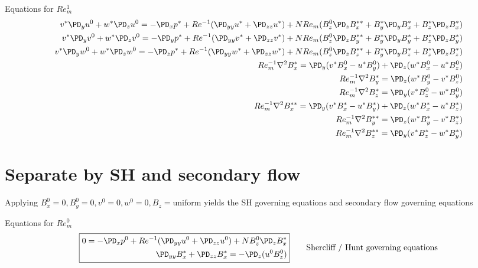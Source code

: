 \documentclass[11pt]{article}
\begin{document}
Equations for $Re_m^1$
\begin{equation}\begin{aligned}
v^* \PD_y u^0 + w^* \PD_z u^0 = -\PD_x p^*+ Re^{-1} (\PD_{yy} u^* + \PD_{zz} u^*) + N Re_m (B_z^0 \PD_z B_x^{**} + B_y^* \PD_y B_x^* + B_z^* \PD_z B_x^* ) \\
v^* \PD_y v^0 + w^* \PD_z v^0 = -\PD_y p^*+ Re^{-1} (\PD_{yy} v^* + \PD_{zz} v^*) + N Re_m (B_z^0 \PD_z B_y^{**} + B_y^* \PD_y B_y^* + B_z^* \PD_z B_y^* ) \\
v^* \PD_y w^0 + w^* \PD_z w^0 = -\PD_z p^*+ Re^{-1} (\PD_{yy} w^* + \PD_{zz} w^*) + N Re_m (B_z^0 \PD_z B_z^{**} + B_y^* \PD_y B_z^* + B_z^* \PD_z B_z^* ) \\
Re_m^{-1} \nabla^2 B_x^{*}  = \PD_y (v^* B_x^{0} - u^* B_y^{0}) + \PD_z (w^* B_x^{0} - u^* B_z^{0}) \\
Re_m^{-1} \nabla^2 B_y^{*}  = \PD_z (w^* B_y^{0} - v^* B_z^{0}) \\
Re_m^{-1} \nabla^2 B_z^{*}  = \PD_y (v^* B_z^{0} - w^* B_y^{0}) \\
Re_m^{-1} \nabla^2 B_x^{**} = \PD_y (v^* B_x^{*} - u^* B_y^{*}) + \PD_z (w^* B_x^{*} - u^* B_z^{*}) \\
Re_m^{-1} \nabla^2 B_y^{**} = \PD_z (w^* B_y^{*} - v^* B_z^{*}) \\
Re_m^{-1} \nabla^2 B_z^{**} = \PD_y (v^* B_z^{*} - w^* B_y^{*}) \\
\end{aligned}\end{equation}

\section{Separate by SH and secondary flow}
Applying $B_x^0=0,B_y^0=0,v^0=0, w^0=0,B_z=\text{uniform}$ yields the SH governing equations and secondary flow governing equations

Equations for $Re_m^0$
\begin{equation}\boxed{\begin{aligned}
0 = -\PD_x p^0 + Re^{-1} (\PD_{yy} u^0 + \PD_{zz} u^0 ) + N B_z^0 \PD_z B_x^* \\
\PD_{yy} B_x^* + \PD_{zz} B_x^* = - \PD_z (u^0 B_z^0) \\
\end{aligned}} \qquad \text{Shercliff / Hunt governing equations}\end{equation}
\end{document}
